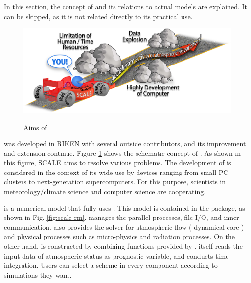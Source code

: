 In this section, the concept of \scalelib and its relations to actual models are explained. It can be skipped, as it is not related directly to its practical use.


\begin{figure}[htb]
\begin{center}
  \includegraphics[width=0.9\hsize]{./figure/library.eps}\\
  \caption{Aims of \scalelib}
  \label{fig:scale}
\end{center}
\end{figure}

\scalelib was developed in RIKEN with several outside contributors,
and its improvement and extension continue.
Figure \ref{fig:scale} shows the schematic concept of \scalelib.
As shown in this figure, SCALE aims to resolve various problems.
The development of \scalelib is considered in the context of its wide use
by devices ranging from small PC clusters to next-generation supercomputers.
For this purpose, scientists in meteorology/climate science
and computer science are cooperating.

\scalerm is a numerical model that fully uses \scalelib.
This model is contained in the \scalelib package,
as shown in Fig. \ref{fig:scale-rm}.
\scalelib manages the parallel processes,
file I/O, and inner-communication.
\scalelib also provides the solver for atmospheric flow ( dynamical core )
and physical processes such as micro-physics and radiation processes.
On the other hand,
\scalerm is constructed by combining functions provided by \scalelib.
\scalerm itself reads the input data of atmospheric status as prognostic variable,
and conducts time-integration.
Users can select a scheme in every component according to simulations they want.

